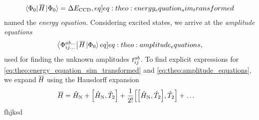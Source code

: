 \begin{align}
    \braansatz \simham \ketansatz = \DECCD, \label[eq]{eq:theo:energy_equation_sim_transformed}
\end{align}
named the \textit{energy equation}. Considering excited states, we arrive at the \textit{amplitude equations}
\begin{align}
    \braexed{ab\ldots}{ij\ldots} \simham \ketansatz \label[eq]{eq:theo:amplitude_equations},
\end{align}
used for finding the unknown amplitudes $t^{ab}_{ij}$. To find explicit expressions for \cref{eq:theo:energy_equation_sim_transformed} and \cref{eq:theo:amplitude_equations}, we expand $\overline{\mkern-1.9mu H\mkern-0.9mu}$ using the Hausdorff expansion
\begin{align*}
    \simham &= \hamno + \commutator{\hamno}{\cluster{2}} + \frac{1}{2!}\commutator{\commutator{\hamno}{\cluster{2}}}{\cluster{2}} + \ldots %
\end{align*}
fhjksd